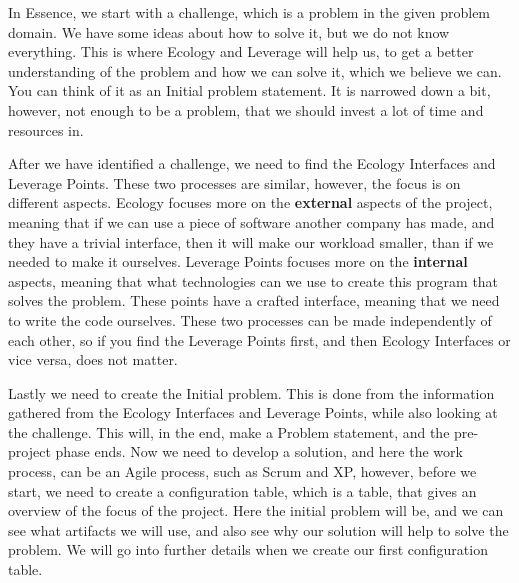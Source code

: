 In Essence, we start with a challenge, which is a problem in the given problem domain.
We have some ideas about how to solve it, but we do not know everything.
This is where Ecology and Leverage will help us, to get a better understanding of the problem and how we can solve it, which we believe we can.
You can think of it as an Initial problem statement.
It is narrowed down a bit, however, not enough to be a problem, that we should invest a lot of time and resources in.

After we have identified a challenge, we need to find the Ecology Interfaces and Leverage Points.
These two processes are similar, however, the focus is on different aspects.
Ecology focuses more on the \textbf{external} aspects of the project, meaning that if we can use a piece of software another company has made, and they have a trivial interface, then it will make our workload smaller, than if we needed to make it ourselves.
Leverage Points focuses more on the \textbf{internal} aspects, meaning that what technologies can we use to create this program that solves the problem.
These points have a crafted interface, meaning that we need to write the code ourselves.
These two processes can be made independently of each other, so if you find the Leverage Points first, and then Ecology Interfaces or vice versa, does not matter.

Lastly we need to create the Initial problem. 
This is done from the information gathered from the Ecology Interfaces and Leverage Points, while also looking at the challenge.
This will, in the end, make a Problem statement, and the pre-project phase ends.
Now we need to develop a solution, and here the work process, can be an Agile process, such as Scrum and XP, however, before we start, we need to create a configuration table, which is a table, that gives an overview of the focus of the project. Here the initial problem will be, and we can see what artifacts we will use, and also see why our solution will help to solve the problem.
We will go into further details when we create our first configuration table.
